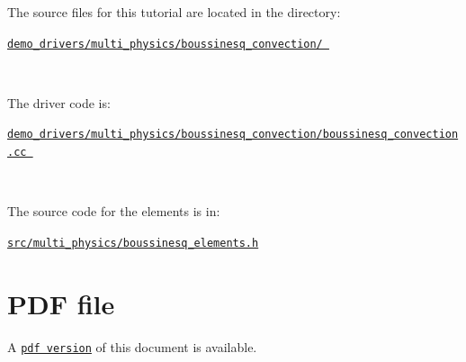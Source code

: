 \begin{DoxyItemize}
\item The source files for this tutorial are located in the directory\+:~\newline
~\newline
\begin{center} \href{
../../../../
demo_drivers/multi_physics/boussinesq_convection/
}{\tt demo\+\_\+drivers/multi\+\_\+physics/boussinesq\+\_\+convection/ } \end{center} ~\newline

\item The driver code is\+: ~\newline
~\newline
\begin{center} \href{
../../../../
demo_drivers/multi_physics/boussinesq_convection/boussinesq_convection.cc
}{\tt demo\+\_\+drivers/multi\+\_\+physics/boussinesq\+\_\+convection/boussinesq\+\_\+convection.\+cc } \end{center}  ~\newline

\item The source code for the elements is in\+: ~\newline
~\newline
\begin{center} \href{../../../../src/multi_physics/boussinesq_elements.h}{\tt src/multi\+\_\+physics/boussinesq\+\_\+elements.\+h} \end{center} 
\end{DoxyItemize}



 

 \hypertarget{index_pdf}{}\section{P\+D\+F file}\label{index_pdf}
A \href{../latex/refman.pdf}{\tt pdf version} of this document is available. 
